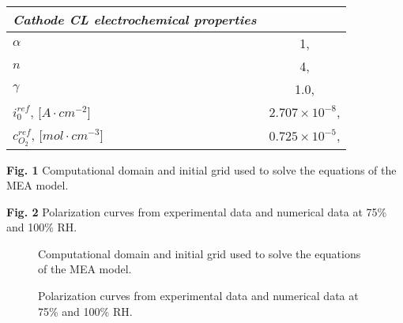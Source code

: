 \documentclass[]{elsart}
\begin{document}
\begin{table}[ptb]
\begin{center}
\begin{tabular}{lc}
	\it{Cathode CL electrochemical properties} \\ \hline
    	$\alpha$                                                  & 1, \cite{Parthasarathy92a,Parthasarathy92b,Neyerlin06}                   \\
    	$n$                                                          & 4,   \cite{Parthasarathy92a,Parthasarathy92b,Sun05}         \\
	$\gamma$                                                & 1.0, \cite{Parthasarathy92a,Parthasarathy92b,Sun05}           \\
    	$i^{ref}_0$, [$A\cdot cm^{-2}$]                 &$2.707\times10^{-8}$, \cite{Parthasarathy92a,Parthasarathy92b}        \\
	$c^{ref}_{O_2}$, [$mol \cdot cm^{-3}$]     & $0.725\times10^{-5}$, \cite{Parthasarathy92a,Parthasarathy92b}   \\
    	\hline \hline
\end{tabular} \end{center} \end{table}



\clearpage

\begin{list}{}{\leftmargin 2cm  }

\item[\bf Fig. 1] Computational domain and initial grid used to solve the equations of the MEA model. 
\item[\bf Fig. 2] Polarization curves from experimental data and numerical data at 75\% and 100\% RH. 
\end{list}

\clearpage

\begin{figure}[btp]
\begin{center}
\caption{Computational domain and initial grid used to solve the equations of the MEA model.}
\label{fig:domain_and_mesh}
\end{center}
\end{figure}

\begin{figure}[btp]
\begin{center}
\caption{Polarization curves from experimental data and numerical data at 75\% and 100\% RH.}
\label{fig:experimental_validation}
\end{center}
\end{figure}
\end{document}
